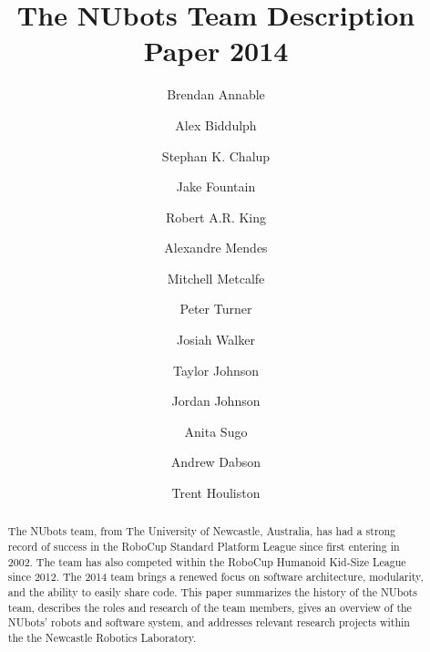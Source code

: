 \documentclass{llncs}
\begin{document}
%

\frontmatter          %
%
\pagestyle{headings}  %
%
%
\mainmatter              %
%
\title{The NUbots Team Description Paper 2014}
%

\author{Brendan Annable \and Alex Biddulph \and Stephan K. Chalup \and Jake Fountain \and Robert A.R. King \and Alexandre Mendes \and Mitchell Metcalfe \and Peter Turner \and Josiah Walker \and Taylor Johnson \and Jordan Johnson \and Anita Sugo \and Andrew Dabson \and Trent Houliston}
%
%
%
%

\maketitle              %

\begin{abstract}
The NUbots team, from The University of Newcastle, Australia, has had a strong record of success in the RoboCup Standard Platform League since first entering in 2002. The team has also competed within the RoboCup Humanoid Kid-Size League since 2012. The 2014 team brings a renewed focus on software architecture, modularity, and the ability to easily share code. This paper summarizes the history of the NUbots team, describes the roles and research of the team members, gives an overview of the NUbots' robots and software system, and addresses relevant research projects within the the Newcastle Robotics Laboratory.
\end{abstract}
\end{document}
